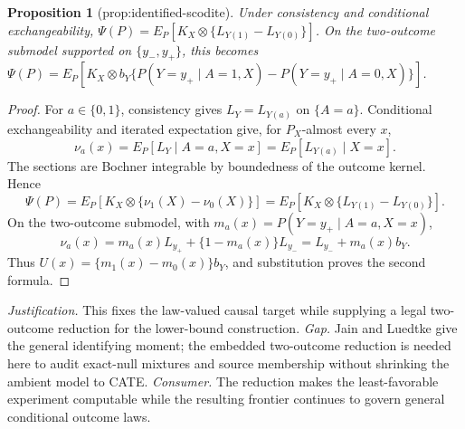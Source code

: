\documentclass{article}
\newtheorem{proposition}{Proposition}
\begin{document}
\begin{proposition}[prop:identified-scodite]\label{prop:identified-scodite}
Under consistency and conditional exchangeability, \(\Psi(P)=E_P[K_X\otimes\{L_{Y(1)}-L_{Y(0)}\}]\). On the two-outcome submodel supported on \(\{y_-,y_+\}\), this becomes \(\Psi(P)=E_P[K_X\otimes b_Y\{P(Y=y_+\mid A=1,X)-P(Y=y_+\mid A=0,X)\}]\).
\end{proposition}
\begin{proof}
For \(a\in\{0,1\}\), consistency gives \(L_Y=L_{Y(a)}\) on \(\{A=a\}\). Conditional exchangeability and iterated expectation give, for \(P_X\)-almost every \(x\),
\[
\nu_a(x)=E_P[L_Y\mid A=a,X=x]=E_P[L_{Y(a)}\mid X=x].
\]
The sections are Bochner integrable by boundedness of the outcome kernel. Hence
\[
\Psi(P)=E_P[K_X\otimes\{\nu_1(X)-\nu_0(X)\}]
=E_P[K_X\otimes\{L_{Y(1)}-L_{Y(0)}\}].
\]
On the two-outcome submodel, with \(m_a(x)=P(Y=y_+\mid A=a,X=x)\),
\[
\nu_a(x)=m_a(x)L_{y_+}+\{1-m_a(x)\}L_{y_-}
=L_{y_-}+m_a(x)b_Y.
\]
Thus \(U(x)=\{m_1(x)-m_0(x)\}b_Y\), and substitution proves the second formula.
\end{proof}
\par\smallskip\noindent \textit{Justification.} This fixes the law-valued causal target while supplying a legal two-outcome reduction for the lower-bound construction. \textit{Gap.} Jain and Luedtke give the general identifying moment; the embedded two-outcome reduction is needed here to audit exact-null mixtures and source membership without shrinking the ambient model to CATE. \textit{Consumer.} The reduction makes the least-favorable experiment computable while the resulting frontier continues to govern general conditional outcome laws.
\end{document}
